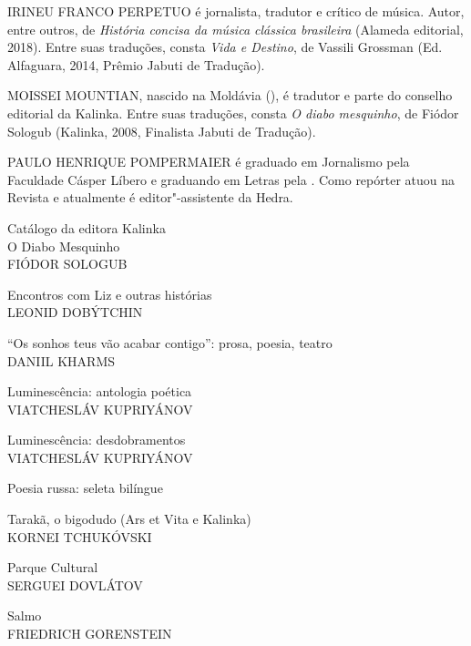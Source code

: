 \medskip

\noindent{}IRINEU FRANCO PERPETUO é jornalista, tradutor e crítico de música. Autor, entre outros, de \emph{História concisa da música clássica brasileira} (Alameda editorial, 2018). Entre suas traduções, consta \emph{Vida e Destino}, de Vassili Grossman (Ed. Alfaguara, 2014, Prêmio Jabuti de Tradução).

\medskip

\noindent{}MOISSEI MOUNTIAN, nascido na Moldávia (), é tradutor e parte do conselho editorial da Kalinka. Entre suas traduções, consta \emph{O diabo mesquinho}, de Fiódor Sologub (Kalinka, 2008, Finalista Jabuti de Tradução).
 
\medskip

\noindent{}PAULO HENRIQUE POMPERMAIER é graduado em Jornalismo pela Faculdade Cásper Líbero e graduando em Letras pela . Como repórter atuou na Revista  e atualmente é editor"-assistente da Hedra.

\afterpage{\blankpage}

\newpage
\pagestyle{empty}
\MyriadPro

\noindent{}Catálogo da editora Kalinka\\[5pt]

\noindent{}O Diabo Mesquinho\\
FIÓDOR SOLOGUB
\medskip

\noindent{}Encontros com Liz e outras histórias\\
LEONID DOBÝTCHIN
\medskip

\noindent{}``Os sonhos teus vão acabar contigo'': prosa, poesia, teatro\\
DANIIL KHARMS
\medskip

\noindent{}Luminescência: antologia poética\\
VIATCHESLÁV KUPRIYÁNOV
\medskip

\noindent{}Luminescência: desdobramentos\\
VIATCHESLÁV KUPRIYÁNOV
\medskip

\noindent{}Poesia russa: seleta bilíngue
\medskip

\noindent{}Tarakã, o bigodudo (Ars et Vita e Kalinka)\\
KORNEI TCHUKÓVSKI
\medskip

\noindent{}Parque Cultural\\
SERGUEI DOVLÁTOV
\medskip

\noindent{}Salmo\\
FRIEDRICH GORENSTEIN
\medskip

